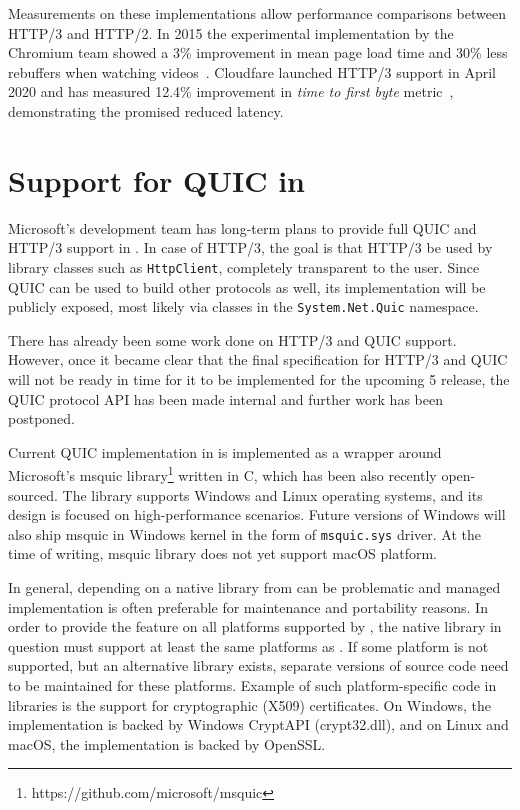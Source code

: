 Measurements on these implementations allow performance comparisons between HTTP/3 and HTTP/2. In
2015 the experimental implementation by the Chromium team showed a 3\% improvement in mean page load
time and 30\% less rebuffers when watching videos~\cite{Wilk2015}. Cloudfare launched HTTP/3 support
in April 2020 and has measured 12.4\% improvement in \textit{time to first byte}
metric~\cite{Tellakula2020}, demonstrating the promised reduced latency.

\section{Support for QUIC in \dotnet{}}

Microsoft's development team has long-term plans to provide full QUIC and HTTP/3 support in \dotnet{}.
In case of HTTP/3, the goal is that HTTP/3 be used by library classes such as \texttt{HttpClient},
completely transparent to the user. Since QUIC can be used to build other protocols as well, its
implementation will be publicly exposed, most likely via classes in the \texttt{System.Net.Quic}
namespace.

There has already been some work done on HTTP/3 and QUIC support. However, once it became clear that
the final specification for HTTP/3 and QUIC will not be ready in time for it to be implemented for
the upcoming \dotnet{} 5 release, the QUIC protocol API has been made internal and further work has
been postponed.

Current QUIC implementation in \dotnet{} is implemented as a wrapper around Microsoft's msquic
library\footnote{https://github.com/microsoft/msquic} written in C, which has been also recently
open-sourced. The library supports Windows and Linux operating systems, and its design is focused on
high-performance scenarios. Future versions of Windows will also ship msquic in Windows kernel in
the form of \texttt{msquic.sys} driver. At the time of writing, msquic library does not yet support
macOS platform.

In general, depending on a native library from \dotnet{} can be problematic and managed
implementation is often preferable for maintenance and portability reasons. In order to provide the
feature on all platforms supported by \dotnet{}, the native library in question must support at
least the same platforms as \dotnet{}. If some platform is not supported, but an alternative library
exists, separate versions of \dotnet{} source code need to be maintained for these platforms.
Example of such platform-specific code in \dotnet{} libraries is the support for cryptographic
(X509) certificates. On Windows, the implementation is backed by Windows CryptAPI (crypt32.dll), and
on Linux and macOS, the implementation is backed by OpenSSL\@. 

